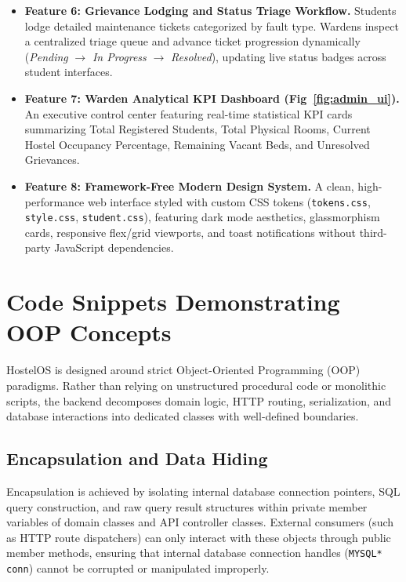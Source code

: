 \documentclass[12pt,a4paper]{article}
\begin{document}
\begin{itemize}
    \item \textbf{Feature 6: Grievance Lodging and Status Triage Workflow.}
    Students lodge detailed maintenance tickets categorized by fault type. Wardens inspect a centralized triage queue and advance ticket progression dynamically (\textit{Pending} $\rightarrow$ \textit{In Progress} $\rightarrow$ \textit{Resolved}), updating live status badges across student interfaces.

    \item \textbf{Feature 7: Warden Analytical KPI Dashboard (Fig~\ref{fig:admin_ui}).}
    An executive control center featuring real-time statistical KPI cards summarizing Total Registered Students, Total Physical Rooms, Current Hostel Occupancy Percentage, Remaining Vacant Beds, and Unresolved Grievances.

    \item \textbf{Feature 8: Framework-Free Modern Design System.}
    A clean, high-performance web interface styled with custom CSS tokens (\texttt{tokens.css}, \texttt{style.css}, \texttt{student.css}), featuring dark mode aesthetics, glassmorphism cards, responsive flex/grid viewports, and toast notifications without third-party JavaScript dependencies.
\end{itemize}

\section{Code Snippets Demonstrating OOP Concepts}
\label{sec:code}
HostelOS is designed around strict Object-Oriented Programming (OOP) paradigms. Rather than relying on unstructured procedural code or monolithic scripts, the backend decomposes domain logic, HTTP routing, serialization, and database interactions into dedicated classes with well-defined boundaries.

\subsection{Encapsulation and Data Hiding}
\label{sec:encapsulation}
Encapsulation is achieved by isolating internal database connection pointers, SQL query construction, and raw query result structures within private member variables of domain classes and API controller classes. External consumers (such as HTTP route dispatchers) can only interact with these objects through public member methods, ensuring that internal database connection handles (\texttt{MYSQL* conn}) cannot be corrupted or manipulated improperly.
\end{document}
